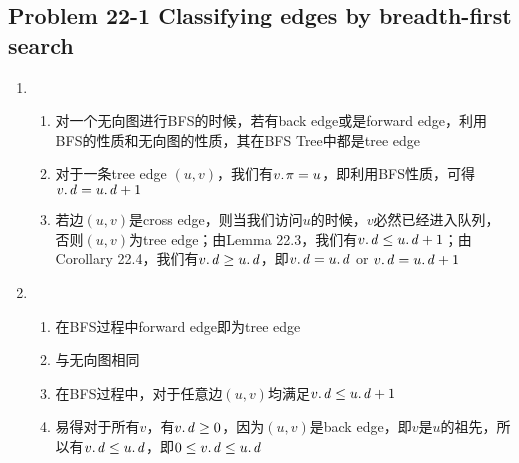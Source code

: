 \subsection*{Problem 22-1 Classifying edges by breadth-first search}
\begin{enumerate}
	\item	\begin{enumerate}
			\item	对一个无向图进行BFS的时候，若有back edge或是forward edge，利用BFS的性质和无向图的性质，其在BFS Tree中都是tree edge
			\item	对于一条tree edge $(u, v)$，我们有$\attrib{v}{\pi} = u$，即利用BFS性质，可得$\attrib{v}{d} = \attrib{u}{d} + 1$
			\item	若边$(u, v)$是cross edge，则当我们访问$u$的时候，$v$必然已经进入队列，否则$(u, v)$为tree edge；由Lemma 22.3，我们有$\attrib{v}{d} \leq \attrib{u}{d} + 1$；由Corollary 22.4，我们有$\attrib{v}{d} \geq \attrib{u}{d}$，即$\attrib{v}{d} = \attrib{u}{d}$ or $\attrib{v}{d} = \attrib{u}{d} + 1$
		\end{enumerate}
	\item	\begin{enumerate}
			\item	在BFS过程中forward edge即为tree edge
			\item	与无向图相同
			\item	在BFS过程中，对于任意边$(u, v)$均满足$\attrib{v}{d} \leq \attrib{u}{d} + 1$
			\item	易得对于所有$v$，有$\attrib{v}{d} \geq 0$，因为$(u, v)$是back edge，即$v$是$u$的祖先，所以有$\attrib{v}{d} \leq \attrib{u}{d}$，即$0 \leq \attrib{v}{d} \leq \attrib{u}{d}$
		\end{enumerate}
\end{enumerate}

